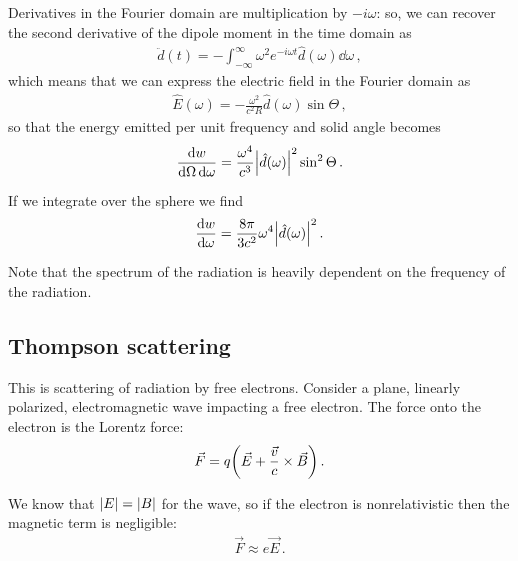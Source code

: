 \documentclass[main.tex]{subfiles}
\begin{document}
Derivatives in the Fourier domain are multiplication by \(-i \omega \): so, we can recover the second derivative of the dipole moment in the time domain as 
%
\begin{align}
\ddot{d} (t) = - \int_{- \infty }^{\infty } \omega^2 e^{-i \omega t} \hat{d}(\omega ) \dd{\omega }
\,,
\end{align}
%
which means that we can express the electric field in the Fourier domain as 
%
\begin{align}
\hat{E} ( \omega ) = - \frac{\omega^2}{c^2 R} \hat{d}(\omega ) \sin \Theta 
\,,
\end{align}
%
so that the energy emitted per unit frequency and solid angle becomes 
%
\begin{align}
\frac{ \dd{w}}{ \dd{\Omega } \dd{\omega }}  = \frac{\omega^{4}}{c^3} \abs{\hat{d}(\omega  )}^2 \sin^2 \Theta 
\,.
\end{align}

If we integrate over the sphere we find 
%
\begin{align}
\dv{w}{\omega } = \frac{8 \pi }{3 c^2} \omega^{4} \abs{\hat{d}(\omega )}^2
\,.
\end{align}

Note that the spectrum of the radiation is heavily dependent on the frequency of the radiation. 

\subsection{Thompson scattering}

This is scattering of radiation by free electrons. 
Consider a plane, linearly polarized, electromagnetic wave impacting a free electron. The force onto the electron is the Lorentz force: 
%
\begin{align}
\vec{F} = q \qty(\vec{E} + \frac{\vec{v}}{c} \times \vec{B})
\,.
\end{align}

We know that \(\abs{E} = \abs{B}\) for the wave, so if the electron is nonrelativistic then the magnetic term is negligible: 
%
\begin{align}
\vec{F} \approx e \vec{E}
\,.
\end{align}
\end{document}
